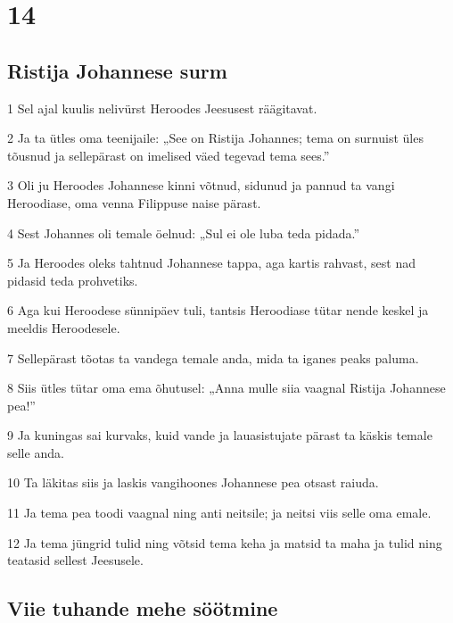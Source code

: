 \chapter{14}

\section*{Ristija Johannese surm}

\par 1 Sel ajal kuulis nelivürst Heroodes Jeesusest räägitavat.
\par 2 Ja ta ütles oma teenijaile: „See on Ristija Johannes; tema on surnuist üles tõusnud ja sellepärast on imelised väed tegevad tema sees.”
\par 3 Oli ju Heroodes Johannese kinni võtnud, sidunud ja pannud ta vangi Heroodiase, oma venna Filippuse naise pärast.
\par 4 Sest Johannes oli temale öelnud: „Sul ei ole luba teda pidada.”
\par 5 Ja Heroodes oleks tahtnud Johannese tappa, aga kartis rahvast, sest nad pidasid teda prohvetiks.
\par 6 Aga kui Heroodese sünnipäev tuli, tantsis Heroodiase tütar nende keskel ja meeldis Heroodesele.
\par 7 Sellepärast tõotas ta vandega temale anda, mida ta iganes peaks paluma.
\par 8 Siis ütles tütar oma ema õhutusel: „Anna mulle siia vaagnal Ristija Johannese pea!”
\par 9 Ja kuningas sai kurvaks, kuid vande ja lauasistujate pärast ta käskis temale selle anda.
\par 10 Ta läkitas siis ja laskis vangihoones Johannese pea otsast raiuda.
\par 11 Ja tema pea toodi vaagnal ning anti neitsile; ja neitsi viis selle oma emale.
\par 12 Ja tema jüngrid tulid ning võtsid tema keha ja matsid ta maha ja tulid ning teatasid sellest Jeesusele.

\section*{Viie tuhande mehe söötmine}

